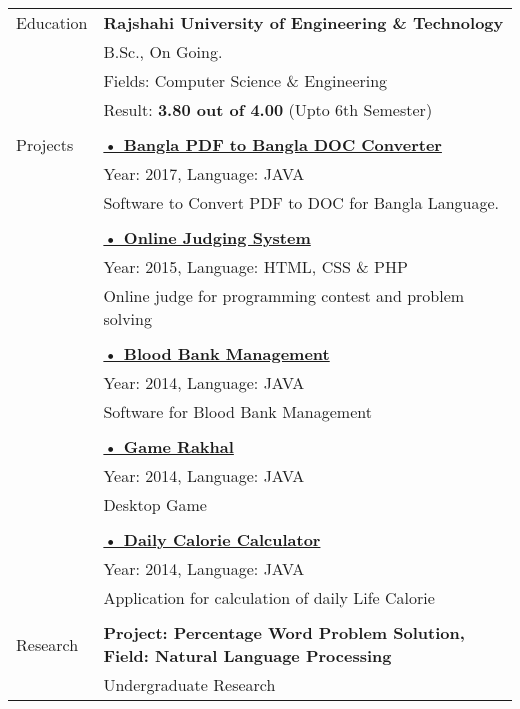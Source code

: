 \documentclass[letterpaper,11pt,oneside]{article}
\begin{document}
\noindent \begin{tabular}{@{} l l}

 \Large{Education}    & \textbf{Rajshahi University of Engineering \& Technology} \\
     & B.Sc., On Going. \\
     & Fields: Computer Science \& Engineering \\
     & Result: \textbf{3.80 out of 4.00} (Upto 6th Semester)\\
     \\
 \Large{Projects}    &  \href{https://github.com/habibruetian12/BanglaPDFtoBanglaDOC}{\textbf{• Bangla PDF to Bangla DOC Converter}} \\
 	& Year: 2017, Language: JAVA\\
    & \parbox{5.0in}{Software to Convert PDF to DOC for Bangla Language.}\\
    & \\
    & \href{https://github.com/habibrahmanbd/onlinelabsystem}{\textbf{• Online Judging System}}\\
    & Year: 2015, Language: HTML, CSS \& PHP \\
    & \parbox{5.0in}{Online judge for programming contest and problem solving}\\
    & \\
    & \href{https://github.com/habibrahmanbd/nirob-blood-app/}{\textbf{• Blood Bank Management}}\\
    & Year: 2014, Language: JAVA \\
    & \parbox{5.0in}{Software for Blood Bank Management}\\
    & \\
    & \href{https://github.com/habibrahmanbd/Game-Rakhal-v1.0/}{\textbf{• Game Rakhal}}\\
    & Year: 2014, Language: JAVA \\
    & \parbox{5.0in}{Desktop Game}\\
    & \\
    & \href{https://github.com/habibrahmanbd/dailyCalorieCalculator}{\textbf{• Daily Calorie Calculator}}\\
    & Year: 2014, Language: JAVA \\
    & \parbox{5.0in}{Application for calculation of daily Life Calorie}\\
    \\
 \Large{Research}    & \textbf{Project: Percentage Word Problem Solution, Field: Natural Language Processing} \\
     & Undergraduate Research \\

\end{tabular}
\end{document}

